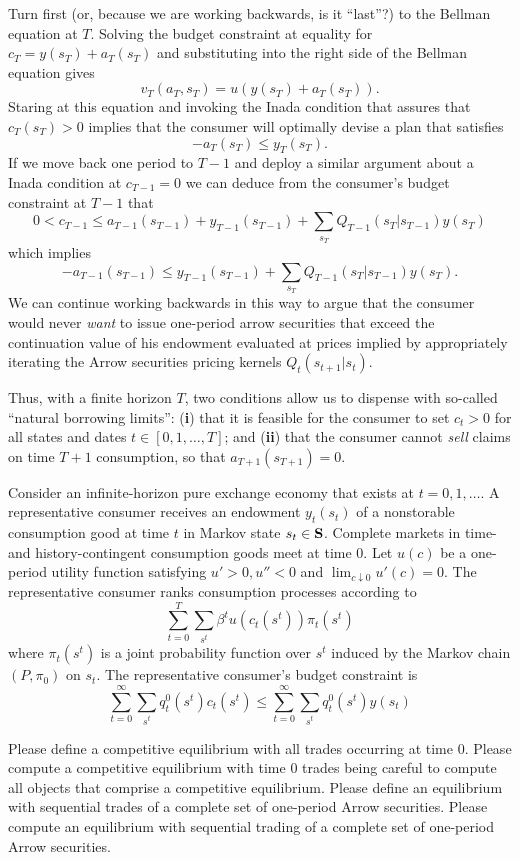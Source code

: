 Turn first (or,  because we are working backwards, is it ``last''?) to the Bellman equation at $T$. Solving the budget constraint at equality for $c_T =y(s_T) + a_T(s_T)$ and substituting into the right side of the Bellman equation gives
$$ v_T(a_T, s_T) = u(y(s_T) + a_T(s_T) ). $$
Staring at this equation and invoking the Inada condition that assures that $c_T(s_T) >0$  implies that the consumer
will optimally devise a plan that satisfies
$$ - a_T(s_T) \leq y_T(s_T) .$$
If we move back one period to $T-1$ and deploy  a similar argument about a Inada condition at $c_{T-1} = 0$  we can deduce from the consumer's budget constraint at $T-1$ that
$$ 0 < c_{T-1} \leq a_{T-1}(s_{T-1}) + y_{T-1}(s_{T-1}) + \sum_{s_T} Q_{T-1}(s_T | s_{T-1}) y(s_T) $$
which implies
$$ - a_{T-1}(s_{T-1})  \leq  y_{T-1}(s_{T-1}) + \sum_{s_T} Q_{T-1}(s_T | s_{T-1}) y(s_T) .$$
We can continue working backwards in this way to argue that the consumer would never {\it want\/}
to issue one-period arrow securities that exceed the continuation value of his endowment evaluated at 
prices implied  by  appropriately iterating the Arrow securities pricing kernels $Q_t(s_{t+1}|s_t)$.

Thus, with a finite horizon $T$, two conditions  allow us to dispense with so-called ``natural borrowing limits'':
({\bf i})  that it is feasible for the consumer to set $c_t >0$ for all states and dates $t \in [0, 1, \ldots, T]$;
and ({\bf ii}) that the consumer cannot {\it sell\/} claims on time $T+1$ consumption, so that $a_{T+1}(s_{T+1}) = 0$.


\medskip
{} Consider an infinite-horizon pure exchange economy that exists at $t=0, 1, \ldots $.
A representative consumer receives an endowment $y_t(s_t)$ of a nonstorable consumption good at time $t$
in Markov state $s_t \in {\bf S}$.  Complete markets in time- and  history-contingent consumption goods
meet at time $0$. Let $u(c)$ be a one-period utility 
function satisfying $u' > 0, u'' < 0$ and $\lim_{c \downarrow 0} u'(c) = 0$. The representative consumer ranks consumption processes according to 
$$ \sum_{t=0}^T \sum_{s^t} \beta^t u(c_t(s^t)) \pi_t(s^t)$$
where $\pi_t(s^t)$ is a joint probability function over $s^t$ induced by the Markov chain $(P, \pi_0)$ on $s_t$.
The representative consumer's budget constraint is
$$ \sum_{t=0}^\infty \sum_{s^t} q_t^0(s^t) c_t(s^t) \leq  \sum_{t=0}^\infty \sum_{s^t} q_t^0(s^t) y(s_t)  $$
 
\medskip
{} Please define a competitive equilibrium with all trades occurring at time $0$.
\medskip
{} Please compute a competitive equilibrium with time $0$ trades being careful to compute
all objects that comprise a competitive equilibrium.
\medskip
{} Please define an equilibrium with sequential trades of a complete set of one-period Arrow  securities.
\medskip
{} Please compute an equilibrium with sequential trading of a complete set of one-period Arrow securities.


